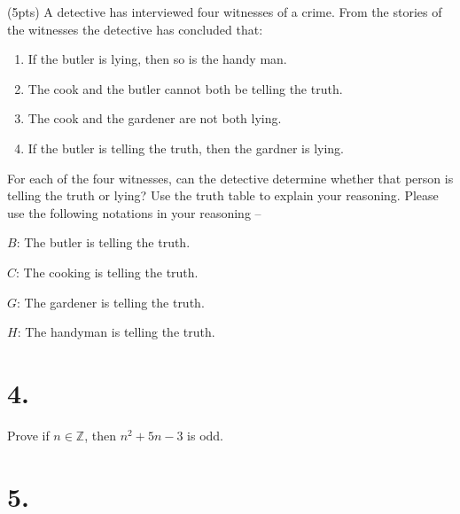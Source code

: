 \documentclass{article}
\newenvironment{Problem}
{\noindent\color{black}}
{\newline}
\newenvironment{Solution}
{\noindent\color{red}}
{\newline}
\begin{document}
\begin{Problem}
    (5pts) A detective has interviewed four witnesses of a crime. From the stories of the witnesses the detective has concluded that:
    \begin{enumerate}
        \item If the butler is lying, then so is the handy man.
        \item The cook and the butler cannot both be telling the truth.
        \item The cook and the gardener are not both lying.
        \item If the butler is telling the truth, then the gardner is lying. 
    \end{enumerate}

    For each of the four witnesses, can the detective determine whether that person is telling the truth or lying? Use the truth table to explain your reasoning. Please use the following notations in your reasoning –
    
    \begin{adjustwidth}{5em}{0em}
        $B$: The butler is telling the truth.

        $C$: The cooking is telling the truth.

        $G$: The gardener is telling the truth.

        $H$: The handyman is telling the truth.
    \end{adjustwidth}

    \phantom{ }
\end{Problem}

\section*{4. }

\begin{Problem}
    Prove if $n \in \mathbb Z$, then $n^2+5n-3$ is odd.
\end{Problem}


\section*{5. }






\end{document}
